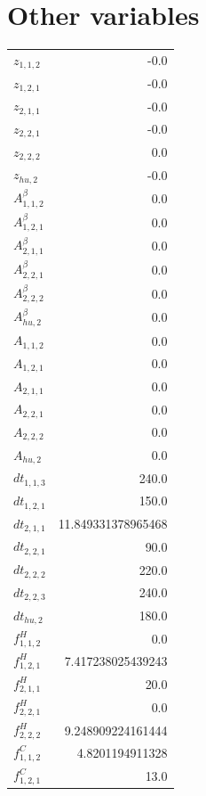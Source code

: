 \documentclass{article}%
\makeatletter
\let\mcnewpage=\newpage%
\newcommand{\TrickSupertabularIntoMulticols}{%
\renewcommand\newpage{%
\if@firstcolumn%
\hrule width\linewidth height0pt%
\columnbreak%
\else%
\mcnewpage%
\fi%
}%
}%
\makeatother
\begin{document}
\section{Other variables}%
\thispagestyle{plain}%
\begin{multicols*}{3}%
\TrickSupertabularIntoMulticols%
%
\begin{supertabular}{lr}%
	$z_{1,1,2}$ & -0.0 \\%
	$z_{1,2,1}$ & -0.0 \\%
	$z_{2,1,1}$ & -0.0 \\%
	$z_{2,2,1}$ & -0.0 \\%
	$z_{2,2,2}$ & 0.0 \\%
	$z_{hu,2}$ & -0.0 \\%
	$A_{1,1,2}^{\beta}$ & 0.0 \\%
	$A_{1,2,1}^{\beta}$ & 0.0 \\%
	$A_{2,1,1}^{\beta}$ & 0.0 \\%
	$A_{2,2,1}^{\beta}$ & 0.0 \\%
	$A_{2,2,2}^{\beta}$ & 0.0 \\%
	$A_{hu,2}^{\beta}$ & 0.0 \\%
	$A_{1,1,2}$ & 0.0 \\%
	$A_{1,2,1}$ & 0.0 \\%
	$A_{2,1,1}$ & 0.0 \\%
	$A_{2,2,1}$ & 0.0 \\%
	$A_{2,2,2}$ & 0.0 \\%
	$A_{hu,2}$ & 0.0 \\%
	$dt_{1,1,3}$ & 240.0 \\%
	$dt_{1,2,1}$ & 150.0 \\%
	$dt_{2,1,1}$ & 11.849331378965468 \\%
	$dt_{2,2,1}$ & 90.0 \\%
	$dt_{2,2,2}$ & 220.0 \\%
	$dt_{2,2,3}$ & 240.0 \\%
	$dt_{hu,2}$ & 180.0 \\%
	$f_{1,1,2}^{H}$ & 0.0 \\%
	$f_{1,2,1}^{H}$ & 7.417238025439243 \\%
	$f_{2,1,1}^{H}$ & 20.0 \\%
	$f_{2,2,1}^{H}$ & 0.0 \\%
	$f_{2,2,2}^{H}$ & 9.248909224161444 \\%
	$f_{1,1,2}^{C}$ & 4.8201194911328 \\%
	$f_{1,2,1}^{C}$ & 13.0 \\%

\end{supertabular}
\end{multicols*}
\end{document}
